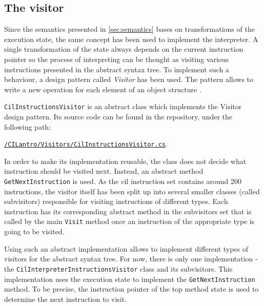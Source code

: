 \documentclass[declaration,shortabstract,english,mgr]{iithesis}
\begin{document}
\subsection{The visitor}
\label{sec:visitor}

Since the semantics presented in \ref{sec:semantics} bases on transformations of the execution state, the same concept has been used to implement the interpreter. A single transformation of the state always depends on the current instruction pointer so the process of interpreting can be thought as visiting various instructions presented in the abstract syntax tree. To implement such a behaviour, a design pattern called \textit{Visitor} has been used. The pattern allows to write a new operation for each element of an object structure \cite{designPatterns}.

\texttt{CilInstructionsVisitor} is an abstract class which implements the Visitor design pattern. Its source code can be found in the repository, under the following path:
\begin{center}
\href{https://github.com/kvasnyk/CILantro/blob/master/CILantro/CILantro/Visitors/CilInstructionsVisitor.cs}{\texttt{/CILantro/Visitors/CilInstructionsVisitor.cs}}.
\end{center}
In order to make its implementation reusable, the class does not decide what instruction should be visited next. Instead, an abstract method \texttt{GetNextInstruction} is used. As the \acrshort{cil} instruction set contains around 200 instructions, the visitor itself has been split up into several smaller classes (called subvisitors) responsible for visiting instructions of different types. Each instruction has its corresponding abstract method in the subvisitors set that is called by the main \texttt{Visit} method once an instruction of the appropriate type is going to be visited.

Using such an abstract implementation allows to implement different types of visitors for the abstract syntax tree. For now, there is only one implementation - the \texttt{CilInterpreterInstructionsVisitor} class and its subvisitors. This implementation uses the execution state to implement the \texttt{GetNextInstruction} method. To be precise, the instruction pointer of the top method state is used to determine the next instruction to visit.
\end{document}
